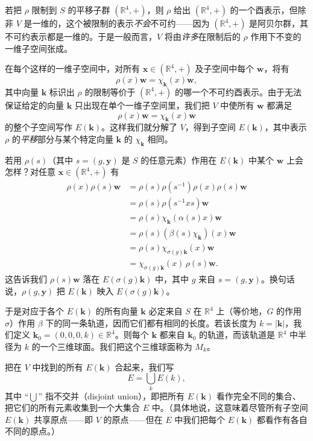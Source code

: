若把 $\rho$ 限制到 $S$ 的平移子群 $(\mathbb{R}^4,+)$，则 $\rho$ 给出 $(\mathbb{R}^4,+)$ 的一个酉表示，但除非 $V$ 是一维的，这个被限制的表示\emph{不会}不可约——因为 $(\mathbb{R}^4,+)$ 是阿贝尔群，其不可约表示都是一维的。于是一般而言，$V$ 将由\emph{许多}在限制后的 $\rho$ 作用下不变的一维子空间张成。

在每个这样的一维子空间中，对所有 $\mathbf{x}\in(\mathbb{R}^4,+)$ 及子空间中每个 $\mathbf{w}$，将有
\[
\rho(x)\mathbf{w}=\chi_{\mathbf{k}}(x)\mathbf{w},
\]
其中向量 $\mathbf{k}$ 标识出 $\rho$ 的限制等价于 $(\mathbb{R}^4,+)$ 的哪一个不可约酉表示。由于无法保证给定的向量 $\mathbf{k}$ 只出现在单个一维子空间里，我们把 $V$ 中使所有 $\mathbf{w}$ 都满足
\[
\rho(x)\mathbf{w}=\chi_{\mathbf{k}}(x)\mathbf{w}
\]
的整个子空间写作 $E(\mathbf{k})$。这样我们就分解了 $V$，得到子空间 $E(\mathbf{k})$，其中表示 $\rho$ 的\emph{平移}部分与某个特定向量 $\mathbf{k}$ 的 $\chi_{\mathbf{k}}$ 相同。


若用 $\rho(s)$（其中 $s=(g,\mathbf{y})$ 是 $S$ 的任意元素）作用在 $E(\mathbf{k})$ 中某个 $\mathbf{w}$ 上会怎样？对任意 $\mathbf{x}\in(\mathbb{R}^4,+)$ 有
\begin{align*}
\rho(x)\rho(s)\mathbf{w}
&=\rho(s)\rho(s^{-1})\rho(x)\rho(s)\mathbf{w}\\
&=\rho(s)\rho(s^{-1}xs)\mathbf{w}\\
&=\rho(s)\chi_{\mathbf{k}}(\alpha(s)x)\mathbf{w}\\
&=\rho(s)(\beta(s)\chi_{\mathbf{k}})(x)\mathbf{w}\\
&=\rho(s)\chi_{\sigma(g)\mathbf{k}}(x)\mathbf{w}\\
&=\chi_{\sigma(g)\mathbf{k}}(x)\,\rho(s)\mathbf{w}.
\end{align*}
这告诉我们 $\rho(s)\mathbf{w}$ 落在 $E(\sigma(g)\mathbf{k})$ 中，其中 $g$ 来自 $s=(g,\mathbf{y})$。换句话说，$\rho(g,\mathbf{y})$ 把 $E(\mathbf{k})$ 映入 $E(\sigma(g)\mathbf{k})$。

于是对应于各个 $E(\mathbf{k})$ 的所有向量 $\mathbf{k}$ 必定来自 $S$ 在 $\mathbb{R}^4$ 上（等价地，$G$ 的作用 $\sigma$）作用 $\beta$ 下的同一条轨道，因而它们都有相同的长度。若该长度为 $k=|\mathbf{k}|$，我们定义 $\mathbf{k}_0=(0,0,0,k)\in\mathbb{R}^4$。则每个 $\mathbf{k}$ 都来自 $\mathbf{k}_0$ 的轨道，而该轨道是 $\mathbb{R}^4$ 中半径为 $k$ 的一个三维球面。我们把这个三维球面称为 $M_k$。

把在 $V$ 中找到的所有 $E(\mathbf{k})$ 合起来，我们写
\[
E=\bigcup_{k}E(k),
\]
其中 “$\bigcup$” 指不交并（disjoint union），即把所有 $E(\mathbf{k})$ 看作完全不同的集合、把它们的所有元素收集到一个大集合 $E$ 中。（具体地说，这意味着尽管所有子空间 $E(\mathbf{k})$ 共享原点——即 $V$ 的原点——但在 $E$ 中我们把每个 $E(\mathbf{k})$ 都看作有各自不同的原点。）

